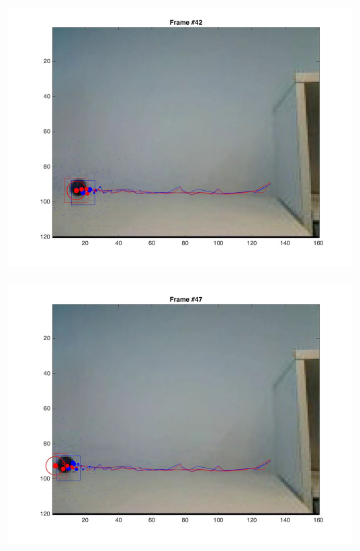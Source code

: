 \documentclass{ethz_report}
\begin{document}
\begin{figure}[h]
\begin{subfigure}[b]{.25\textwidth}
        \includegraphics[width=1\linewidth]{images/video3_bins_high_41}
    \end{subfigure}%
    \begin{subfigure}[b]{.25\textwidth}
        \centering
        \includegraphics[width=1\linewidth]{images/video3_bins_high_46}
    \end{subfigure}%
    \begin{subfigure}[b]{.25\textwidth}
        \centering

\end{subfigure}
\end{figure}
\end{document}
